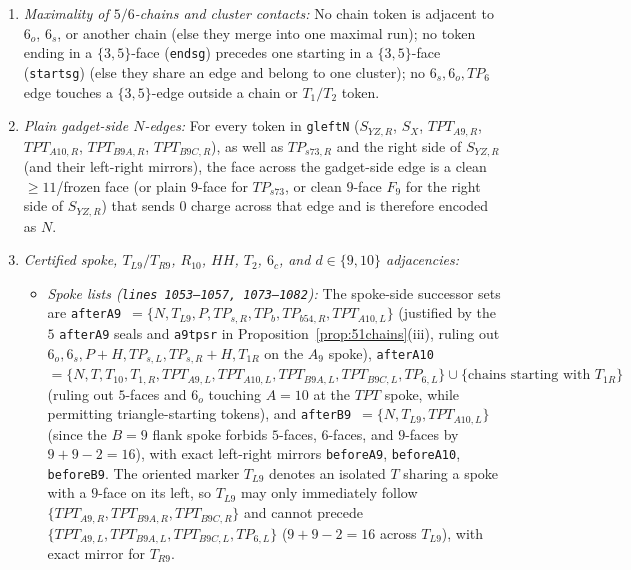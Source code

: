 \documentclass[11pt,reqno]{amsart}
\theoremstyle{plain}
\theoremstyle{definition}
\theoremstyle{remark}
\DeclareRobustCommand{\_}{\ifmmode\text{\textunderscore}\else\textunderscore\allowbreak\fi}
\begin{document}
\begin{enumerate}[label=(\alph*),leftmargin=2.2em]
  \item \emph{Maximality of $5/6$-chains and cluster contacts:} No chain token is adjacent to $6_o$, $6_s$, or another chain (else they merge into one maximal run); no token ending in a $\{3,5\}$-face (\texttt{ends\_g}) precedes one starting in a $\{3,5\}$-face (\texttt{starts\_g}) (else they share an edge and belong to one cluster); no $6_s, 6_o, TP_6$ edge touches a $\{3,5\}$-edge outside a chain or $T_1/T_2$ token.
  \item \emph{Plain gadget-side $N$-edges:} For every token in \texttt{g\_left\_N} ($S_{YZ,R}$, $S_X$, $TPT_{A9,R}$, $TPT_{A10,R}$, $TPT_{B9A,R}$, $TPT_{B9C,R}$), as well as $TP_{s73,R}$ and the right side of $S_{YZ,R}$ (and their left-right mirrors), the face across the gadget-side edge is a clean $\ge 11$/frozen face (or plain $9$-face for $TP_{s73}$, or clean $9$-face $F_9$ for the right side of $S_{YZ,R}$) that sends $0$ charge across that edge and is therefore encoded as $N$.
  \item \emph{Certified spoke, $T_{L9}/T_{R9}$, $R_{10}$, $HH$, $T_2$, $6_c$, and $d \in \{9,10\}$ adjacencies:}
  \begin{itemize}[leftmargin=1.5em]
    \item \emph{Spoke lists (\texttt{lines 1053--1057, 1073--1082}):} The spoke-side successor sets are \texttt{after\_A9}~$= \{N,\allowbreak T_{L9},\allowbreak P,\allowbreak TP_{s,R},\allowbreak TP_b,\allowbreak TP_{b54,R},\allowbreak TPT_{A10,L}\}$ (justified by the $5$ \texttt{after\_A9} seals and \texttt{a9\_tpsr} in Proposition~\ref{prop:51chains}(iii), ruling out $6_o, 6_s, P+H, TP_{s,L}, TP_{s,R}+H, T_{1R}$ on the $A_9$ spoke), \texttt{after\_A10}~$= \{N,\allowbreak T,\allowbreak T_{10},\allowbreak T_{1,R},\allowbreak TPT_{A9,L},\allowbreak TPT_{A10,L},\allowbreak TPT_{B9A,L},\allowbreak TPT_{B9C,L},\allowbreak TP_{6,L}\} \cup \{\text{chains starting with } T_{1R}\}$ (ruling out $5$-faces and $6_o$ touching $A=10$ at the $TPT$ spoke, while permitting triangle-starting tokens), and \texttt{after\_B9}~$= \{N,\allowbreak T_{L9},\allowbreak TPT_{A10,L}\}$ (since the $B=9$ flank spoke forbids $5$-faces, $6$-faces, and $9$-faces by $9+9-2=16$), with exact left-right mirrors \texttt{before\_A9}, \texttt{before\_A10}, \texttt{before\_B9}. The oriented marker $T_{L9}$ denotes an isolated $T$ sharing a spoke with a $9$-face on its left, so $T_{L9}$ may only immediately follow $\{TPT_{A9,R},\allowbreak TPT_{B9A,R},\allowbreak TPT_{B9C,R}\}$ and cannot precede $\{TPT_{A9,L},\allowbreak TPT_{B9A,L},\allowbreak TPT_{B9C,L},\allowbreak TP_{6,L}\}$ ($9+9-2=16$ across $T_{L9}$), with exact mirror for $T_{R9}$.

\end{itemize}
\end{enumerate}
\end{document}
